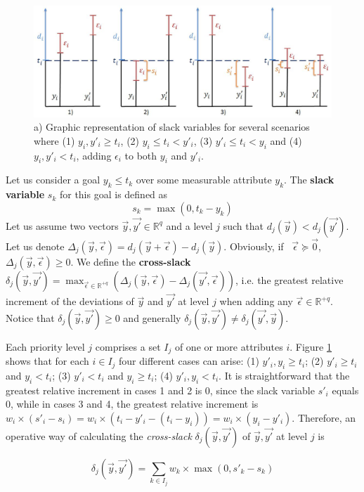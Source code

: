 \begin{figure}[H]
\includegraphics[width=1\textwidth]{Images/Chapter4/slack-variables}
\caption{ a) Graphic representation of slack variables for several scenarios where (1) $y_i, y'_i \geq t_i$, (2) $y_i \leq t_i < y'_i$, (3) $y'_i \leq t_i < y_i$ and (4) $y_i, y'_i < t_i$, adding $\epsilon_i$ to both $y_i$ and $y'_i$.}
\label{fig:2-2}
\end{figure}

\begin{defi}\label{chapMultiObjAlg:slacks}
Let us consider a goal $y_k \leq t_k$ over some measurable attribute $y_k$. The \textbf{slack variable} $s_k$ for this goal is defined as
\begin{equation}\label{eq:slack-def}
s_k = \max(0, t_k - y_k)
\end{equation}
Let us assume two vectors $\vec{y}, \vec{y'} \in \mathbb{R}^q$ and a level $j$ such that $d_j(\vec{y}) < d_j(\vec{y'})$. Let us denote 
$\Delta_j(\vec y, \vec{\epsilon}) = d_j(\vec{y} + \vec{\epsilon}) - d_j(\vec{y})$. Obviously, if \ $\vec{\epsilon} \succeq \vec{0}$, $\Delta_j(\vec y, \vec{\epsilon}) \geq 0$. We define the \textbf{cross-slack}  
$\delta_j(\vec{y},\vec{y'}) = \max_{\vec{\epsilon}\in \mathbb{R}^{+q}} (\Delta_j(\vec{y},\vec{\epsilon}) - \Delta_j(\vec{y'},\vec{\epsilon}))$, i.e. 
the greatest relative increment of the deviations of $\vec y$ and $\vec{y'}$ at level $j$ when adding any $\vec{\epsilon}\in \mathbb{R}^{+q}$. 
Notice that $\delta_j(\vec{y}, \vec{y'}) \geq 0$ and generally $\delta_j(\vec{y}, \vec{y'}) \neq \delta_j(\vec{y'}, \vec{y})$.

Each priority level $j$ comprises a set $I_j$ of one or more attributes $i$. Figure \ref{fig:2-2} shows that for each $i \in I_j$ four different cases can arise: (1) $y'_i, y_i \geq t_i$; (2) $y'_i \geq t_i$ and $y_i < t_i$; (3) $y'_i < t_i$ and $y_i \geq t_i$; (4) $y'_i, y_i < t_i$. It is straightforward that the greatest relative increment in cases 1 and 2 is 0, since the slack variable $s'_i$ equals $0$, while in cases 3 and 4, the greatest relative increment is 
$w_i \times (s'_i - s_i) = w_i \times (t_i - y'_i - (t_i - y_i)) =
w_i \times (y_i - y'_i)$. Therefore, an operative way of calculating the {\em cross-slack} $\delta_j(\vec{y}, \vec{y'})$ of $\vec{y}, \vec{y'}$ at level $j$ is

\begin{equation}\label{eq:slack-var}
    \delta_j(\vec{y}, \vec{y'}) = \sum_{k\in I_j} w_k \times \max(0, s'_k - s_k)
\end{equation}
\end{defi}

